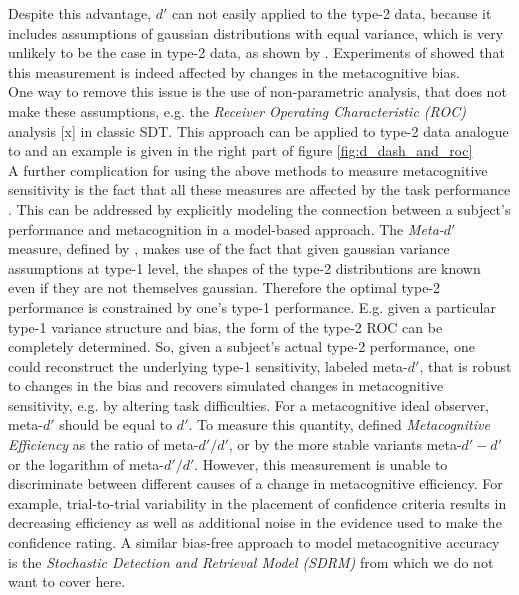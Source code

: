 \documentclass[../main/main.tex]{subfiles}
\begin{document}
	Despite this advantage, $d'$ can not easily applied to the type-2 data, because it includes assumptions of gaussian distributions with equal variance, which is very unlikely to be the case in type-2 data, as shown by \citep{galvin2003type}. Experiments of \citep{azzopardi2007evaluation} showed that this measurement is indeed affected by changes in the metacognitive bias.\\
	One way to remove this issue is the use of non-parametric analysis, that does not make these assumptions, e.g. the \textit{Receiver Operating Characteristic (ROC)} analysis [x] in classic SDT. This approach can be applied to type-2 data analogue to \citep{clarke1959two} and an example is given in the right part of figure \ref{fig:d_dash_and_roc}\\
	A further complication for using the above methods to measure metacognitive sensitivity is the fact that all these measures are affected by the task performance \citep{galvin2003type}. This can be addressed by explicitly modeling the connection between a subject's performance and metacognition in a model-based approach. The \textit{Meta-$d'$} measure, defined by \citep{maniscalco2012signal}, makes use of the fact that given gaussian variance assumptions at type-1 level, the shapes of the type-2 distributions are known even if they are not themselves gaussian. Therefore the optimal type-2 performance is constrained by one's type-1 performance. E.g. given a particular type-1 variance structure and bias, the form of the type-2 ROC can be completely determined. So, given a subject's actual type-2 performance, one could reconstruct the underlying type-1 sensitivity, labeled meta-$d'$, that is robust to changes in the bias and recovers simulated changes in metacognitive sensitivity, e.g. by altering task difficulties. For a metacognitive ideal observer, meta-$d'$ should be equal to $d'$. To measure this quantity, \citep{fleming2014measure} defined \textit{Metacognitive Efficiency} as the ratio of meta-$d'/d'$, or by the more stable variants meta-$d'-d'$ or the logarithm of meta-$d'/d'$. However, this measurement is unable to discriminate between different causes of a change in metacognitive efficiency. For example,  trial-to-trial variability in the placement of confidence criteria results in decreasing efficiency as well as additional noise in the evidence used to make the confidence rating. A similar bias-free approach to model metacognitive accuracy is the \textit{Stochastic Detection and Retrieval Model (SDRM)} from \citep{jang2012stochastic} which we do not want to cover here.\\
\end{document}
